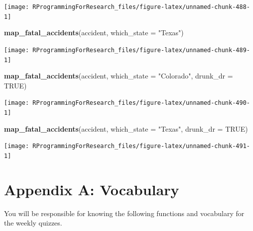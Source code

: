 \documentclass[]{book}
\makeatletter
\newenvironment{Shaded}{\begin{snugshade}}{\end{snugshade}}
\newcommand{\KeywordTok}[1]{\textcolor[rgb]{0.13,0.29,0.53}{\textbf{{#1}}}}
\newcommand{\DataTypeTok}[1]{\textcolor[rgb]{0.13,0.29,0.53}{{#1}}}
\newcommand{\StringTok}[1]{\textcolor[rgb]{0.31,0.60,0.02}{{#1}}}
\newcommand{\OtherTok}[1]{\textcolor[rgb]{0.56,0.35,0.01}{{#1}}}
\newcommand{\NormalTok}[1]{{#1}}
\newenvironment{kframe}{%
\medskip{}
\setlength{\fboxsep}{.8em}
 \def\at@end@of@kframe{}%
 \ifinner\ifhmode%
  \def\at@end@of@kframe{\end{minipage}}%
  \begin{minipage}{\columnwidth}%
 \fi\fi%
 \def\FrameCommand##1{\hskip\@totalleftmargin \hskip-\fboxsep
 \colorbox{shadecolor}{##1}\hskip-\fboxsep
     \hskip-\linewidth \hskip-\@totalleftmargin \hskip\columnwidth}%
 \MakeFramed {\advance\hsize-\width
   \@totalleftmargin\z@ \linewidth\hsize
   \@setminipage}}%
 {\par\unskip\endMakeFramed%
 \at@end@of@kframe}
\renewenvironment{Shaded}{\begin{kframe}}{\end{kframe}}
\makeatother
\begin{document}
\begin{center}\texttt{[image: RProgrammingForResearch\_files/figure-latex/unnamed-chunk-488-1]} \end{center}

\begin{Shaded}
\begin{Highlighting}[]
\KeywordTok{map_fatal_accidents}\NormalTok{(accident, }\DataTypeTok{which_state =} \StringTok{"Texas"}\NormalTok{)}
\end{Highlighting}
\end{Shaded}

\begin{center}\texttt{[image: RProgrammingForResearch\_files/figure-latex/unnamed-chunk-489-1]} \end{center}

\begin{Shaded}
\begin{Highlighting}[]
\KeywordTok{map_fatal_accidents}\NormalTok{(accident, }\DataTypeTok{which_state =} \StringTok{"Colorado"}\NormalTok{, }
                    \DataTypeTok{drunk_dr =} \OtherTok{TRUE}\NormalTok{)}
\end{Highlighting}
\end{Shaded}

\begin{center}\texttt{[image: RProgrammingForResearch\_files/figure-latex/unnamed-chunk-490-1]} \end{center}

\begin{Shaded}
\begin{Highlighting}[]
\KeywordTok{map_fatal_accidents}\NormalTok{(accident, }\DataTypeTok{which_state =} \StringTok{"Texas"}\NormalTok{,}
                    \DataTypeTok{drunk_dr =} \OtherTok{TRUE}\NormalTok{)}
\end{Highlighting}
\end{Shaded}

\begin{center}\texttt{[image: RProgrammingForResearch\_files/figure-latex/unnamed-chunk-491-1]} \end{center}

\appendix


\chapter{Appendix A: Vocabulary}\label{appendix-a-vocabulary}

You will be responsible for knowing the following functions and
vocabulary for the weekly quizzes.
\end{document}
